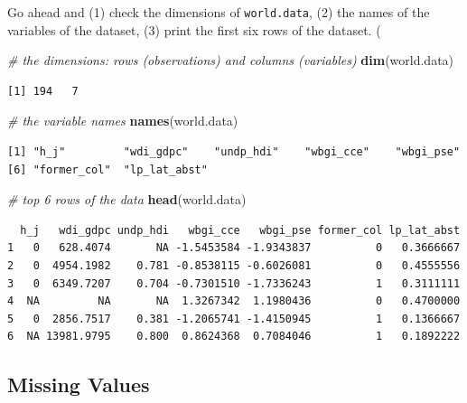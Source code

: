 \documentclass[]{book}
\newenvironment{Shaded}{\begin{snugshade}}{\end{snugshade}}
\newcommand{\KeywordTok}[1]{\textcolor[rgb]{0.13,0.29,0.53}{\textbf{#1}}}
\newcommand{\CommentTok}[1]{\textcolor[rgb]{0.56,0.35,0.01}{\textit{#1}}}
\newcommand{\NormalTok}[1]{#1}
\theoremstyle{definition}
\theoremstyle{definition}
\theoremstyle{definition}
\theoremstyle{remark}
\begin{document}
Go ahead and (1) check the dimensions of \texttt{world.data}, (2) the
names of the variables of the dataset, (3) print the first six rows of
the dataset. (

\begin{Shaded}
\begin{Highlighting}[]
\CommentTok{# the dimensions: rows (observations) and columns (variables) }
\KeywordTok{dim}\NormalTok{(world.data)}
\end{Highlighting}
\end{Shaded}

\begin{verbatim}
[1] 194   7
\end{verbatim}

\begin{Shaded}
\begin{Highlighting}[]
\CommentTok{# the variable names}
\KeywordTok{names}\NormalTok{(world.data) }
\end{Highlighting}
\end{Shaded}

\begin{verbatim}
[1] "h_j"         "wdi_gdpc"    "undp_hdi"    "wbgi_cce"    "wbgi_pse"   
[6] "former_col"  "lp_lat_abst"
\end{verbatim}

\begin{Shaded}
\begin{Highlighting}[]
\CommentTok{# top 6 rows of the data}
\KeywordTok{head}\NormalTok{(world.data)}
\end{Highlighting}
\end{Shaded}

\begin{verbatim}
  h_j   wdi_gdpc undp_hdi   wbgi_cce   wbgi_pse former_col lp_lat_abst
1   0   628.4074       NA -1.5453584 -1.9343837          0   0.3666667
2   0  4954.1982    0.781 -0.8538115 -0.6026081          0   0.4555556
3   0  6349.7207    0.704 -0.7301510 -1.7336243          1   0.3111111
4  NA         NA       NA  1.3267342  1.1980436          0   0.4700000
5   0  2856.7517    0.381 -1.2065741 -1.4150945          1   0.1366667
6  NA 13981.9795    0.800  0.8624368  0.7084046          1   0.1892222
\end{verbatim}

\subsection{Missing Values}\label{missing-values}
\end{document}
